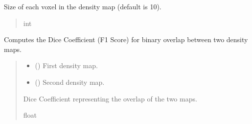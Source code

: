 \documentclass[letterpaper,10pt,english]{sphinxmanual}
\begin{document}
\begin{fulllineitems}

\begin{fulllineitems}
\label{\detokenize{src:src.BagelFitter.BagelFitter.voxel_size}}
\pysigstartsignatures
{}
\pysigstopsignatures
\sphinxAtStartPar
Size of each voxel in the density map (default is 10).
\begin{quote}\begin{description}
\sphinxAtStartPar
int

\end{description}\end{quote}

\end{fulllineitems}


\begin{fulllineitems}
\label{\detokenize{src:src.BagelFitter.BagelFitter.calculate_dice_coefficient}}
\pysigstartsignatures
{}
\pysigstopsignatures
\sphinxAtStartPar
Computes the Dice Coefficient (F1 Score) for binary overlap between two density maps.
\begin{quote}\begin{description}
\begin{itemize}
\item {} 
\sphinxAtStartPar
{} () \textendash{} First density map.

\item {} 
\sphinxAtStartPar
{} () \textendash{} Second density map.

\end{itemize}

\sphinxAtStartPar
Dice Coefficient representing the overlap of the two maps.

\sphinxAtStartPar
float


\end{description}
\end{quote}
\end{fulllineitems}
\end{fulllineitems}
\end{document}
